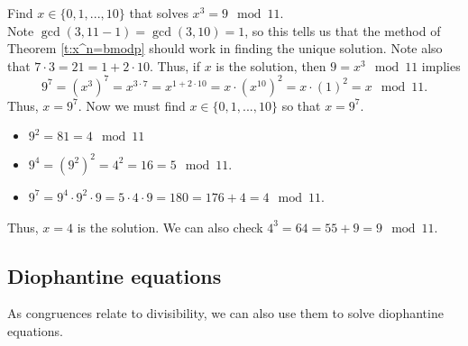 \documentclass[11pt,dvipsnames]{book}
\numberwithin{figure}{section} %
\numberwithin{table}{section} %
\begin{document}
\begin{example}
 Find $x\in\{0,1,...,10\}$ that solves $x^{3} = 9 \mod 11$.  \\

Note $\gcd(3,11-1)=\gcd(3,10)=1$, so this tells us that the method of Theorem \ref{t:x^n=bmodp} should work in finding the unique solution. Note also that $7\cdot 3 = 21=1+2\cdot 10$.  Thus, if $x$ is the solution, then $9 = x^{3}\mod 11$ implies
\[
9^{7} = (x^{3})^{7}
=x^{3\cdot 7}
 =x^{1+2\cdot 10}
  =x\cdot (x^{10})^{2}
   = x\cdot(1)^{2}
  =x \mod 11.\]
  Thus, $x = 9^{7}$. Now we must find $x\in \{0,1,...,10\}$ so that $x = 9^{7}$.
  \begin{itemize}
  \item $9^{2}=81   = 4 \mod 11$
  \item $9^{4}=(9^{2})^{2}   = 4^{2}  =16 = 5\mod 11$.
  \item $9^{7}=9^{4}\cdot 9^{2}\cdot 9  = 5\cdot 4\cdot 9 =180 =176+4 = 4\mod 11$.
  \end{itemize}

Thus, $x=4$ is the solution.  We can also check $4^{3}=64=55+9 = 9\mod 11$.

\end{example}

\subsection{Diophantine equations}

As congruences relate to divisibility, we can also use them to solve diophantine equations.
\end{document}
